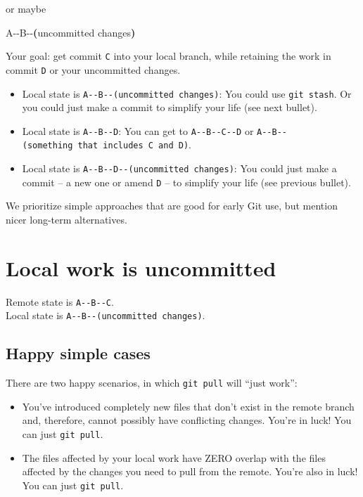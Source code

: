 \documentclass[
]{book}
\newenvironment{Shaded}{\begin{snugshade}}{\end{snugshade}}
\newcommand{\ErrorTok}[1]{\textcolor[rgb]{0.64,0.00,0.00}{\textbf{#1}}}
\newcommand{\ExtensionTok}[1]{#1}
\newcommand{\KeywordTok}[1]{\textcolor[rgb]{0.13,0.29,0.53}{\textbf{#1}}}
\newcommand{\NormalTok}[1]{#1}
\providecommand{\tightlist}{%
  \setlength{\itemsep}{0pt}\setlength{\parskip}{0pt}}
\begin{document}
or maybe

\begin{Shaded}
\begin{Highlighting}[]
\ExtensionTok{A{-}{-}B{-}{-}}\ErrorTok{(}\ExtensionTok{uncommitted}\NormalTok{ changes}\KeywordTok{)}
\end{Highlighting}
\end{Shaded}

Your goal: get commit \texttt{C} into your local branch, while retaining the work in commit \texttt{D} or your uncommitted changes.

\begin{itemize}
\tightlist
\item
  Local state is \texttt{A-\/-B-\/-(uncommitted\ changes)}: You could use \texttt{git\ stash}. Or you could just make a commit to simplify your life (see next bullet).
\item
  Local state is \texttt{A-\/-B-\/-D}: You can get to \texttt{A-\/-B-\/-C-\/-D} or \texttt{A-\/-B-\/-(something\ that\ includes\ C\ and\ D)}.
\item
  Local state is \texttt{A-\/-B-\/-D-\/-(uncommitted\ changes)}: You could just make a commit -- a new one or amend \texttt{D} -- to simplify your life (see previous bullet).
\end{itemize}

We prioritize simple approaches that are good for early Git use, but mention nicer long-term alternatives.

\section{Local work is uncommitted}\label{local-work-is-uncommitted}

Remote state is \texttt{A-\/-B-\/-C}.\\
Local state is \texttt{A-\/-B-\/-(uncommitted\ changes)}.

\subsection{Happy simple cases}\label{happy-simple-cases}

There are two happy scenarios, in which \texttt{git\ pull} will ``just work'':

\begin{itemize}
\tightlist
\item
  You've introduced completely new files that don't exist in the remote branch and, therefore, cannot possibly have conflicting changes. You're in luck! You can just \texttt{git\ pull}.
\item
  The files affected by your local work have ZERO overlap with the files affected by the changes you need to pull from the remote. You're also in luck! You can just \texttt{git\ pull}.
\end{itemize}
\end{document}
